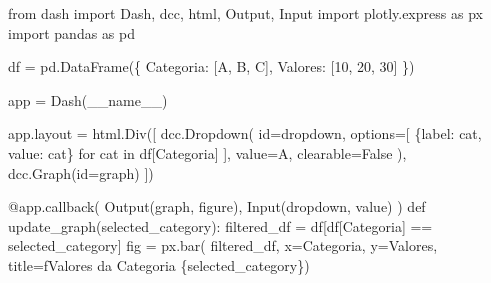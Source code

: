 \documentclass[
  12pt,
  a4paper,
]{scrreprt}
\newenvironment{Shaded}{}{}
\newcommand{\AttributeTok}[1]{\textcolor[rgb]{0.84,0.23,0.29}{#1}}
\newcommand{\BuiltInTok}[1]{\textcolor[rgb]{0.84,0.23,0.29}{#1}}
\newcommand{\ControlFlowTok}[1]{\textcolor[rgb]{0.84,0.23,0.29}{#1}}
\newcommand{\DecValTok}[1]{\textcolor[rgb]{0.00,0.36,0.77}{#1}}
\newcommand{\ImportTok}[1]{\textcolor[rgb]{0.01,0.18,0.38}{#1}}
\newcommand{\KeywordTok}[1]{\textcolor[rgb]{0.84,0.23,0.29}{#1}}
\newcommand{\NormalTok}[1]{\textcolor[rgb]{0.14,0.16,0.18}{#1}}
\newcommand{\OperatorTok}[1]{\textcolor[rgb]{0.14,0.16,0.18}{#1}}
\newcommand{\SpecialCharTok}[1]{\textcolor[rgb]{0.00,0.36,0.77}{#1}}
\newcommand{\SpecialStringTok}[1]{\textcolor[rgb]{0.01,0.18,0.38}{#1}}
\newcommand{\StringTok}[1]{\textcolor[rgb]{0.01,0.18,0.38}{#1}}
\newcommand{\VariableTok}[1]{\textcolor[rgb]{0.89,0.38,0.04}{#1}}
\begin{document}
\begin{Shaded}
\begin{Highlighting}[]
\ImportTok{from}\NormalTok{ dash }\ImportTok{import}\NormalTok{ Dash, dcc, html, Output, Input}
\ImportTok{import}\NormalTok{ plotly.express }\ImportTok{as}\NormalTok{ px}
\ImportTok{import}\NormalTok{ pandas }\ImportTok{as}\NormalTok{ pd}

\NormalTok{df }\OperatorTok{=}\NormalTok{ pd.DataFrame(\{}
    \StringTok{\textquotesingle{}Categoria\textquotesingle{}}\NormalTok{: [}\StringTok{\textquotesingle{}A\textquotesingle{}}\NormalTok{, }\StringTok{\textquotesingle{}B\textquotesingle{}}\NormalTok{, }\StringTok{\textquotesingle{}C\textquotesingle{}}\NormalTok{],}
    \StringTok{\textquotesingle{}Valores\textquotesingle{}}\NormalTok{: [}\DecValTok{10}\NormalTok{, }\DecValTok{20}\NormalTok{, }\DecValTok{30}\NormalTok{]}
\NormalTok{\})}

\NormalTok{app }\OperatorTok{=}\NormalTok{ Dash(}\VariableTok{\_\_name\_\_}\NormalTok{)}

\NormalTok{app.layout }\OperatorTok{=}\NormalTok{ html.Div([}
\NormalTok{    dcc.Dropdown(}
        \BuiltInTok{id}\OperatorTok{=}\StringTok{\textquotesingle{}dropdown\textquotesingle{}}\NormalTok{,}
\NormalTok{        options}\OperatorTok{=}\NormalTok{[}
\NormalTok{          \{}\StringTok{\textquotesingle{}label\textquotesingle{}}\NormalTok{: cat, }\StringTok{\textquotesingle{}value\textquotesingle{}}\NormalTok{: cat\}}
          \ControlFlowTok{for}\NormalTok{ cat }\KeywordTok{in}\NormalTok{ df[}\StringTok{\textquotesingle{}Categoria\textquotesingle{}}\NormalTok{]}
\NormalTok{        ],}
\NormalTok{        value}\OperatorTok{=}\StringTok{\textquotesingle{}A\textquotesingle{}}\NormalTok{,}
\NormalTok{        clearable}\OperatorTok{=}\VariableTok{False}
\NormalTok{    ),}
\NormalTok{    dcc.Graph(}\BuiltInTok{id}\OperatorTok{=}\StringTok{\textquotesingle{}graph\textquotesingle{}}\NormalTok{)}
\NormalTok{])}

\AttributeTok{@app.callback}\NormalTok{(}
\NormalTok{    Output(}\StringTok{\textquotesingle{}graph\textquotesingle{}}\NormalTok{, }\StringTok{\textquotesingle{}figure\textquotesingle{}}\NormalTok{),}
\NormalTok{    Input(}\StringTok{\textquotesingle{}dropdown\textquotesingle{}}\NormalTok{, }\StringTok{\textquotesingle{}value\textquotesingle{}}\NormalTok{)}
\NormalTok{)}
\KeywordTok{def}\NormalTok{ update\_graph(selected\_category):}
\NormalTok{    filtered\_df }\OperatorTok{=}\NormalTok{ df[df[}\StringTok{\textquotesingle{}Categoria\textquotesingle{}}\NormalTok{] }\OperatorTok{==}\NormalTok{ selected\_category]}
\NormalTok{    fig }\OperatorTok{=}\NormalTok{ px.bar(}
\NormalTok{      filtered\_df,}
\NormalTok{      x}\OperatorTok{=}\StringTok{\textquotesingle{}Categoria\textquotesingle{}}\NormalTok{,}
\NormalTok{      y}\OperatorTok{=}\StringTok{\textquotesingle{}Valores\textquotesingle{}}\NormalTok{,}
\NormalTok{      title}\OperatorTok{=}\SpecialStringTok{f\textquotesingle{}Valores da Categoria }\SpecialCharTok{\{}\NormalTok{selected\_category}\SpecialCharTok{\}}\SpecialStringTok{\textquotesingle{}}\NormalTok{)}


\end{Highlighting}
\end{Shaded}
\end{document}
